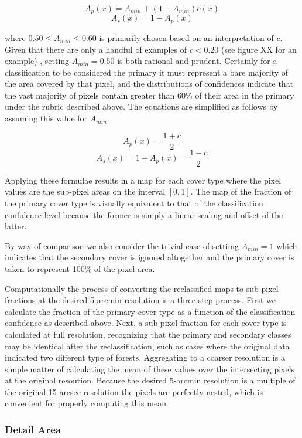 $$
A_p(x) = A_{min} + (1 - A_{min}) c(x)
$$
$$
A_s(x) = 1 - A_p(x)
$$

where $0.50 \le A_{min} \le 0.60$ is primarily chosen based on an
interpretation of $c$.  Given that there are only a handful of
examples of $c < 0.20$ (see figure XX for an example) , setting $A_{min} =
0.50$ is both rational and prudent.  Certainly for a classification to
be considered the primary it must represent a bare majority of the
area covered by that pixel, and the distributions of confidences
indicate that the vast majority of pixels contain greater than 60\% of
their area in the primary under the rubric described above. The
equations are simplified as follows by assuming this value for
$A_{min}$.

$$
A_p(x) = \dfrac{1 + c}{2}
$$
$$
A_s(x) = 1 - A_p(x) = \dfrac{1-c}{2}
$$

Applying these formulae results in a map for each cover type where the
pixel values are the sub-pixel areas on the interval $[0,1]$.  The map
of the fraction of the primary cover type is visually equivalent to
that of the classification confidence level because the former is
simply a linear scaling and offset of the latter.  

By way of comparison we also consider the trivial case of settimg
$A_{min} = 1$ which indicates that the secondary cover is ignored
altogether and the primary cover is taken to represent 100\% of the
pixel area.

Computationally the process of converting the reclassified maps to
sub-pixel fractions at the desired 5-arcmin resolution is a three-step
process.  First we calculate the fraction of the primary cover type as
a function of the classification confidence as described above.  Next,
a sub-pixel fraction for each cover type is calculated at full
resolution, recognizing that the primary and secondary classes may be
identical after the reclassification, such as cases where the original
data indicated two different type of forests.  Aggregating to a
coarser resolution is a simple matter of calculating the mean of these
values over the intersecting pixels at the original resoution.
Because the desired 5-arcmin resolution is a multiple of the original
15-arcsec resolution the pixels are perfectly nested, which is
convenient for properly computing this mean.

\subsubsection{Detail Area}
\label{sec:agg-detail-area}


